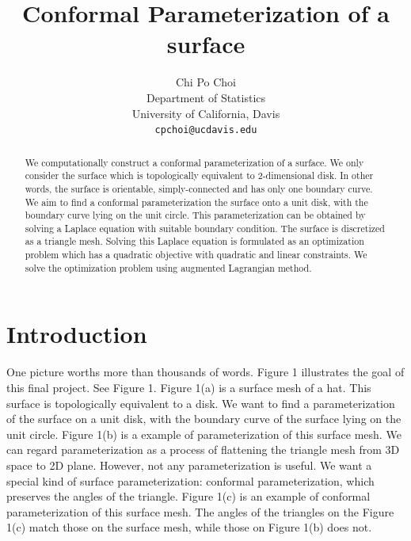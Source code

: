 \documentclass{article} %
\title{Conformal Parameterization of a surface}
\author{
Chi Po Choi \\
Department of Statistics\\
University of California, Davis\\
\texttt{cpchoi@ucdavis.edu} \\
}
\begin{document}
\maketitle

\begin{abstract}
We computationally construct a conformal parameterization of a surface. We only consider the surface which is topologically equivalent to 2-dimensional disk. In other words, the surface is orientable, simply-connected and has only one boundary curve. We aim to find a conformal parameterization the surface onto a unit disk, with the boundary curve lying on the unit circle. This parameterization can be obtained by solving a Laplace equation with suitable boundary condition. The surface is discretized as a triangle mesh. Solving this Laplace equation is formulated as an optimization problem which has a quadratic objective with quadratic and linear constraints. We solve the optimization problem using augmented Lagrangian method.
\end{abstract}

\section{Introduction}

One picture worths more than thousands of words. Figure 1 illustrates the goal of this final project. See Figure 1. Figure 1(a) is a surface mesh of a hat. This surface is topologically equivalent to a disk. We want to find a  parameterization of the surface on a unit disk, with the boundary curve of the surface lying on the unit circle. Figure 1(b) is a example of parameterization of this surface mesh. We can regard parameterization as a process of flattening the triangle mesh from 3D space to 2D plane. However, not any parameterization is useful. We want a special kind of surface parameterization: conformal parameterization, which preserves the angles of the triangle. Figure 1(c) is an example of conformal parameterization of this surface mesh. The angles of the triangles on the Figure 1(c) match those on the surface mesh, while those on Figure 1(b) does not.
\end{document}
